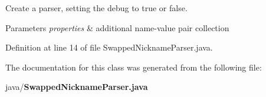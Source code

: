 Create a parser, setting the debug to true or false. 


\begin{DoxyParams}{Parameters}
{\em properties} & additional name-\/value pair collection \\
\hline
\end{DoxyParams}


Definition at line 14 of file Swapped\+Nickname\+Parser.\+java.



The documentation for this class was generated from the following file\+:\begin{DoxyCompactItemize}
\item 
java/{\bf Swapped\+Nickname\+Parser.\+java}\end{DoxyCompactItemize}
